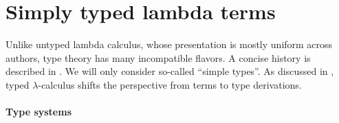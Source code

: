 \section{Simply typed lambda terms}\label{sec:simply_typed_lambda_terms}

Unlike untyped lambda calculus, whose presentation is mostly uniform across authors, type theory has many incompatible flavors. A concise history is described in . We will only consider so-called \enquote{simple types}. As discussed in , typed \( \lambda \)-calculus shifts the perspective from terms to type derivations.

\paragraph{Type systems}

